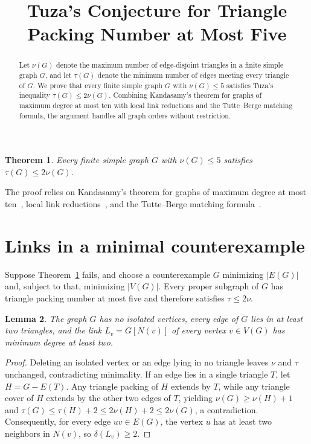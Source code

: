 \documentclass[11pt]{article}
\title{Tuza's Conjecture for Triangle Packing Number at Most Five}
\author{}
\date{}
\newtheorem{theorem}{Theorem}
\newtheorem{lemma}[theorem]{Lemma}
\begin{document}
\maketitle

\begin{abstract}
Let $\nu(G)$ denote the maximum number of edge-disjoint triangles in a finite simple graph $G$, and let $\tau(G)$ denote the minimum number of edges meeting every triangle of $G$. We prove that every finite simple graph $G$ with $\nu(G)\leq 5$ satisfies Tuza's inequality $\tau(G)\leq 2\nu(G)$. Combining Kandasamy's theorem for graphs of maximum degree at most ten with local link reductions and the Tutte--Berge matching formula, the argument handles all graph orders without restriction.
\end{abstract}

\begin{theorem}\label{thm:main}
Every finite simple graph $G$ with $\nu(G)\leq 5$ satisfies $\tau(G)\leq 2\nu(G)$.
\end{theorem}

The proof relies on Kandasamy's theorem for graphs of maximum degree at most ten~\cite{Kandasamy}, local link reductions~\cite{LinkReductions}, and the Tutte--Berge matching formula~\cite{Schrijver}.

\section{Links in a minimal counterexample}

Suppose Theorem~\ref{thm:main} fails, and choose a counterexample $G$ minimizing $|E(G)|$ and, subject to that, minimizing $|V(G)|$. Every proper subgraph of $G$ has triangle packing number at most five and therefore satisfies $\tau\leq 2\nu$.

\begin{lemma}\label{lem:basic}
The graph $G$ has no isolated vertices, every edge of $G$ lies in at least two triangles, and the link $L_v=G[N(v)]$ of every vertex $v\in V(G)$ has minimum degree at least two.
\end{lemma}

\begin{proof}
Deleting an isolated vertex or an edge lying in no triangle leaves $\nu$ and $\tau$ unchanged, contradicting minimality. If an edge lies in a single triangle $T$, let $H=G-E(T)$. Any triangle packing of $H$ extends by $T$, while any triangle cover of $H$ extends by the other two edges of $T$, yielding $\nu(G)\geq\nu(H)+1$ and $\tau(G)\leq\tau(H)+2\leq 2\nu(H)+2\leq 2\nu(G)$, a contradiction. Consequently, for every edge $uv\in E(G)$, the vertex $u$ has at least two neighbors in $N(v)$, so $\delta(L_v)\geq 2$.
\end{proof}
\end{document}
